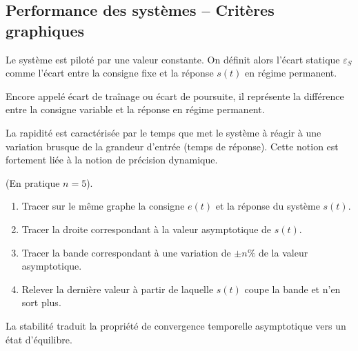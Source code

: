 \documentclass[10pt,fleqn]{article} %
\begin{document}
\subsection*{Performance des systèmes -- Critères graphiques}
\begin{defi}

Le système est piloté par une valeur constante. On définit alors l'écart statique $\varepsilon_S$ comme l'écart entre la consigne fixe et la réponse $s(t)$ en régime permanent.
\end{defi}

\begin{defi}

Encore appelé écart de traînage ou écart de poursuite, il représente la différence entre la consigne variable et la réponse en régime permanent. 
\end{defi}

\begin{defi}[Rapidité]

La rapidité est caractérisée par le temps que met le système à réagir à une
variation brusque de la grandeur d'entrée (temps de réponse). Cette notion est
fortement liée à la notion de précision dynamique.
\end{defi}

\begin{methode}
 (En pratique $n=5$).\\

\begin{enumerate}
 \item Tracer sur le même graphe la consigne $e(t)$ et la réponse du système
$s(t)$.
\item Tracer la droite correspondant à la valeur asymptotique de $s(t)$.
\item Tracer la bande correspondant à une variation de $\pm n\%$ de la valeur
asymptotique.
\item Relever la dernière valeur à partir de laquelle $s(t)$ coupe la bande et
n'en sort plus.
\end{enumerate}
\end{methode}

\begin{defi}[Stabilité]

La stabilité traduit la propriété de convergence temporelle asymptotique vers
un état d'équilibre. 
\end{defi}
\end{document}

